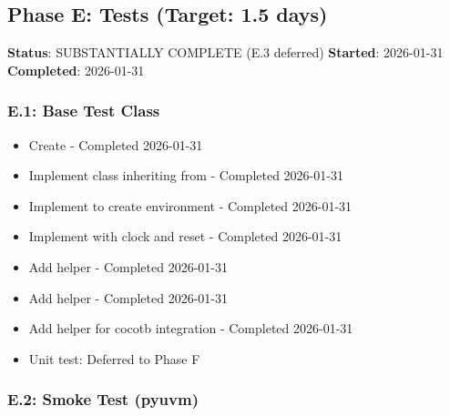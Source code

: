 \subsection{Phase E: Tests (Target: 1.5 days)}\label{cr:status:pyuvm-migration:phase-e-tests-target-15-days}

\begin{record}

\textbf{Status}: \ok{} SUBSTANTIALLY COMPLETE (E.3 deferred)
\textbf{Started}: 2026-01-31 \textbf{Completed}: 2026-01-31

\end{record}

\subsubsection{E.1: Base Test Class}\label{cr:status:pyuvm-migration:e1-base-test-class}

\begin{record}

\begin{itemize}
\tightlist
\item[$\boxtimes$]
  Create  - Completed 2026-01-31
\item[$\boxtimes$]
  Implement  class inheriting from  -
  Completed 2026-01-31
\item[$\boxtimes$]
  Implement  to create environment - Completed
  2026-01-31
\item[$\boxtimes$]
  Implement  with clock and reset - Completed
  2026-01-31
\item[$\boxtimes$]
  Add  helper - Completed 2026-01-31
\item[$\boxtimes$]
  Add  helper - Completed 2026-01-31
\item[$\boxtimes$]
  Add  helper for cocotb integration - Completed
  2026-01-31
\item[$\boxtimes$]
  Unit test: Deferred to Phase F
\end{itemize}

\end{record}

\subsubsection{E.2: Smoke Test (pyuvm)}\label{cr:status:pyuvm-migration:e2-smoke-test-pyuvm}

